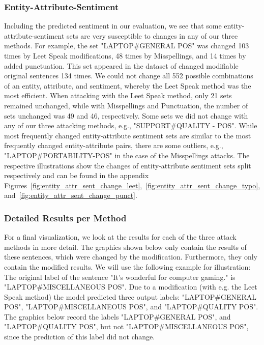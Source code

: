 \subsubsection{Entity-Attribute-Sentiment}
Including the predicted sentiment in our evaluation, we see that some entity-attribute-sentiment sets are very susceptible to changes in any of our three methods. For example, the set "LAPTOP\#GENERAL POS" was changed 103 times by Leet Speak modifications, 48 times by Misspellings, and 14 times by added punctuation. This set appeared in the dataset of changed modifiable original sentences 134 times. We could not change all 552 possible combinations of an entity, attribute, and sentiment, whereby the Leet Speak method was the most efficient. When attacking with the Leet Speak method, only 21 sets remained unchanged, while with Misspellings and Punctuation, the number of sets unchanged was 49 and 46, respectively. Some sets we did not change with any of our three attacking methods, e.g., "SUPPORT\#QUALITY - POS". While most frequently changed entity-attribute sentiment sets are similar to the most frequently changed entity-attribute pairs, there are some outliers, e.g., "LAPTOP\#PORTABILITY-POS" in the case of the Misspellings attacks. The respective illustrations show the changes of entity-attribute sentiment sets split respectively and can be found in the appendix Figures~\ref{fig:entity_attr_sent_change_leet},~\ref{fig:entity_attr_sent_change_typo}, and~\ref{fig:entity_attr_sent_change_punct}.

\subsubsection{Detailed Results per Method}

For a final visualization, we look at the results for each of the three attack methods in more detail.
The graphics shown below only contain the results of these sentences, which were changed by the modification. Furthermore, they only contain the modified results. We will use the following example for illustration:
The original label of the sentence "It's wonderful for computer gaming." is "LAPTOP\#MISCELLANEOUS POS". Due to a modification (with e.g. the Leet Speak method) the model predicted three output labels: "LAPTOP\#GENERAL POS", "LAPTOP\#MISCELLANEOUS POS", and "LAPTOP\#QUALITY POS". The graphics below record the labels "LAPTOP#GENERAL POS", and "LAPTOP\#QUALITY POS", but not "LAPTOP\#MISCELLANEOUS POS", since the prediction of this label did not change. 

